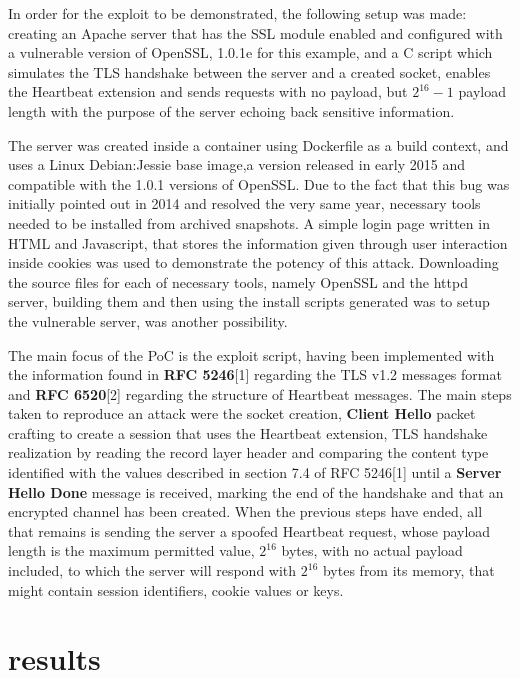 \documentclass[12pt,a4paper,english,onecolumn]{IEEEtran}
\begin{document}
In order for the exploit to be demonstrated, the following setup was made: creating an Apache server that has the SSL module enabled and configured with a vulnerable version of OpenSSL, 1.0.1e for this example, and a C script which simulates the TLS handshake between the server and a created socket, enables the Heartbeat extension and sends requests with no payload, but $2^{16} - 1$ payload length with the purpose of the server echoing back sensitive information. \par
The server was created inside a container using Dockerfile as a build context, and uses a Linux Debian:Jessie base image,a version released in early 2015 and compatible with the 1.0.1 versions of OpenSSL. Due to the fact that this bug was initially pointed out in 2014 and resolved the very same year, necessary tools needed to be installed from archived snapshots. A simple login page written in HTML and Javascript, that stores the information given through user interaction inside cookies was used to demonstrate the potency of this attack.
Downloading the source files for each of necessary tools, namely OpenSSL and the httpd server, building them and then using the install scripts generated was to setup the vulnerable server, was another possibility. \par
    The main focus of the PoC is the exploit script, having been implemented with the information found in \textbf{RFC 5246}[1] regarding the TLS v1.2 messages format and \textbf{RFC 6520}[2] regarding the structure of Heartbeat messages. The main steps taken to reproduce an attack were the socket creation, \textbf{Client Hello} packet crafting to create a session that uses the Heartbeat extension, TLS handshake realization by reading the record layer header and comparing the content type identified with the values described in section 7.4 of RFC 5246[1] until a \textbf{Server Hello Done} message is received, marking the end of the handshake and that an encrypted channel has been created. When the previous steps have ended, all that remains is sending the server a spoofed Heartbeat request, whose payload length is the maximum permitted value, $2^{16}$ bytes, with no actual payload included, to which the server will respond with $2^{16}$ bytes from its memory, that might contain session identifiers, cookie values or keys.

\section{results}
\end{document}
